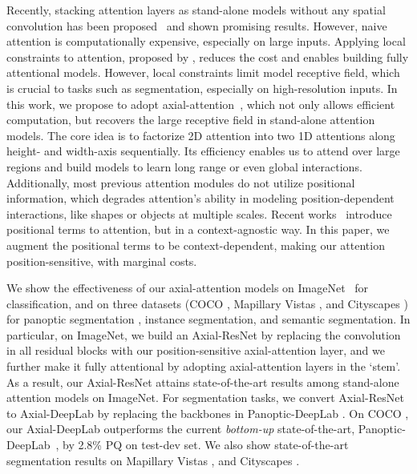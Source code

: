 \documentclass[runningheads]{llncs}
\begin{document}
Recently, stacking attention layers as stand-alone models without any spatial convolution has been proposed~\cite{parmar2019stand,hu2019local} and shown promising results. However, naive attention is computationally expensive, especially on large inputs. Applying local constraints to attention, proposed by \cite{parmar2019stand,hu2019local}, reduces the cost and enables building fully attentional models. However, local constraints limit model receptive field, which is crucial to tasks such as segmentation, especially on high-resolution inputs. In this work, we propose to adopt axial-attention~\cite{ho2019axial,huang2019ccnet}, which not only allows efficient computation, but recovers the large receptive field in stand-alone attention models. The core idea is to factorize 2D attention into two 1D attentions along height- and width-axis sequentially. Its efficiency enables us to attend over large regions and build models to learn long range or even global interactions. Additionally, most previous attention modules do not utilize positional information, which degrades attention's ability in modeling position-dependent interactions, like shapes or objects at multiple scales. Recent works~\cite{parmar2019stand,hu2019local,bello2019attention} introduce positional terms to attention, but in a context-agnostic way. In this paper, we augment the positional terms to be context-dependent, making our attention position-sensitive, with marginal costs.

We show the effectiveness of our axial-attention models on ImageNet~\cite{russakovsky2015imagenet} for classification, and on three datasets (COCO \cite{lin2014microsoft}, Mapillary Vistas \cite{neuhold2017mapillary}, and Cityscapes \cite{Cordts2016Cityscapes}) for panoptic segmentation \cite{kirillov2018panoptic}, instance segmentation, and semantic segmentation. In particular, on ImageNet, we build an Axial-ResNet by replacing the  convolution in all residual blocks \cite{he2016deep} with our position-sensitive axial-attention layer, and we further make it fully attentional \cite{parmar2019stand} by adopting axial-attention layers in the `stem'. As a result, our Axial-ResNet attains state-of-the-art results among stand-alone attention models on ImageNet. For segmentation tasks, we convert Axial-ResNet to Axial-DeepLab by replacing the backbones in Panoptic-DeepLab \cite{cheng2019panopticworkshop}. On COCO \cite{lin2014microsoft}, our Axial-DeepLab outperforms the current {\it bottom-up} state-of-the-art, Panoptic-DeepLab~\cite{cheng2019panoptic}, by 2.8\% PQ on test-dev set. We also show state-of-the-art segmentation results on Mapillary Vistas \cite{neuhold2017mapillary}, and Cityscapes \cite{Cordts2016Cityscapes}.
\end{document}
